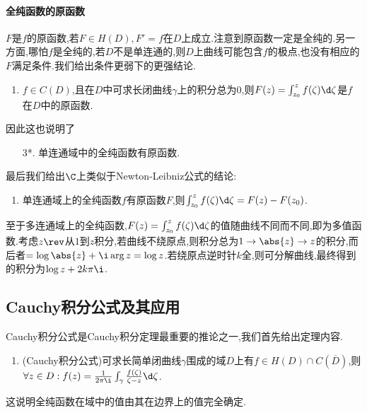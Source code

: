\documentclass{article}
\begin{document}
\paragraph{全纯函数的原函数}$F$是$f$的原函数,若$F\in H(D),F'=f$在$D$上成立.注意到原函数一定是全纯的.另一方面,哪怕$f$是全纯的,若$D$不是单连通的,则$D$上曲线可能包含$f$的极点,也没有相应的$F$满足条件.我们给出条件更弱下的更强结论.

\begin{enumerate}[resume]
    \item $f\in C(D)$,且在$D$中可求长闭曲线$\gamma$上的积分总为0,则$F(z)=\int_{z_0}^{z}f(\zeta)\d\zeta$是$f$在$D$中的原函数.\\
\end{enumerate}

因此这也说明了\begin{enumerate}
    \item[3*.] 单连通域中的全纯函数有原函数.
\end{enumerate}

最后我们给出$\C$上类似于Newton-Leibniz公式的结论:
\begin{enumerate}[start=4]
    \item 单连通域上的全纯函数$f$有原函数$F$,则$\int_{z_0}^{z}f(\zeta)\d\zeta=F(z)-F(z_0)$.\\
\end{enumerate}

至于多连通域上的全纯函数,$F(z)=\int_{z_0}^{z}f(\zeta)\d\zeta$的值随曲线不同而不同,即为多值函数.考虑$z\rev$从$1$到$z$积分,若曲线不绕原点,则积分总为$1\to\abs{z}\to z$的积分,而后者$=\log \abs{z}+\i\arg z=\log z$.若绕原点逆时针$k$全,则可分解曲线,最终得到的积分为$\log z+2k\pi\i$.

\subsection{Cauchy积分公式及其应用}
Cauchy积分公式是Cauchy积分定理最重要的推论之一,我们首先给出定理内容.
\begin{enumerate}
    \item (Cauchy积分公式)可求长简单闭曲线$\gamma$围成的域$D$上有$f\in H(D)\cap C(\overline{D})$,则$\forall z\in D:f(z)=\frac{1}{2\pi\i}\int_\gamma\frac{f(\zeta)}{\zeta-z}\d\zeta$.\\
\end{enumerate}
这说明全纯函数在域中的值由其在边界上的值完全确定.
\end{document}
